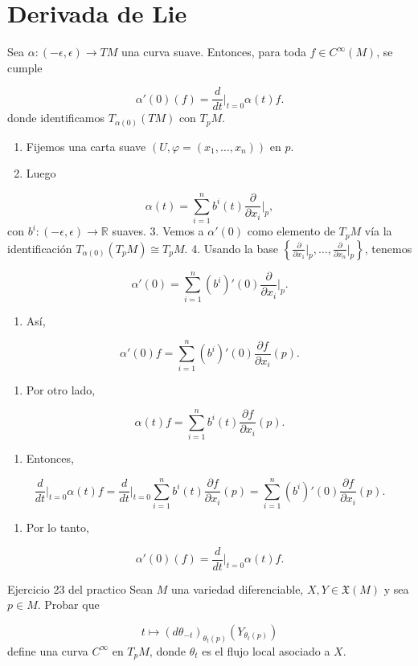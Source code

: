 \section{Derivada de Lie}
\begin{booklemma}{}
Sea $\alpha:(-\epsilon,\epsilon)\to TM$ una curva suave. Entonces, para toda $f\in C^\infty(M)$, se cumple

\[
\alpha'(0)(f)=\frac{d}{dt}\bigg|_{t=0}\alpha(t)f.
\]
donde identificamos $T_{\alpha(0)}(TM)$ con $T_pM$.

\end{booklemma}
\begin{bookproof}{}
\begin{enumerate}
\item Fijemos una carta suave $(U,\varphi=(x_1,\ldots,x_n))$ en $p$.
\item Luego
\end{enumerate}
\[
\alpha(t)=\sum_{i=1}^n b^i(t)\frac{\partial}{\partial x_i}\bigg|_p,
\]
con $b^i:(-\epsilon,\epsilon)\to\mathbb R$ suaves. 3. Vemos a $\alpha'(0)$ como elemento de $T_pM$ vía la identificación $T_{\alpha(0)}(T_pM)\cong T_pM$. 4. Usando la base $\left\{\frac{\partial}{\partial x_1}\bigg|_p,\ldots,\frac{\partial}{\partial x_n}\bigg|_p\right\}$, tenemos

\[
\alpha'(0)=\sum_{i=1}^n (b^i)'(0)\frac{\partial}{\partial x_i}\bigg|_p.
\]
\begin{enumerate}[start=5]
\item Así,
\end{enumerate}
\[
\alpha'(0)f=\sum_{i=1}^n (b^i)'(0)\frac{\partial f}{\partial x_i}(p).
\]
\begin{enumerate}[start=6]
\item Por otro lado,
\end{enumerate}
\[
\alpha(t)f=\sum_{i=1}^n b^i(t)\frac{\partial f}{\partial x_i}(p).
\]
\begin{enumerate}[start=7]
\item Entonces,
\end{enumerate}
\[
\frac{d}{dt}\bigg|_{t=0}\alpha(t)f=\frac{d}{dt}\bigg|_{t=0}\sum_{i=1}^n b^i(t)\frac{\partial f}{\partial x_i}(p)=\sum_{i=1}^n (b^i)'(0)\frac{\partial f}{\partial x_i}(p).
\]
\begin{enumerate}[start=8]
\item Por lo tanto,
\end{enumerate}
\[
\alpha'(0)(f)=\frac{d}{dt}\bigg|_{t=0}\alpha(t)f.
\]
\bookqed
\end{bookproof}
\begin{bookexercise}{Ejercicio 23 del practico}
Sean $M$ una variedad diferenciable, $X,Y\in\mathfrak X(M)$ y sea $p\in M$. Probar que

\[
t\mapsto(d\theta_{-t})_{\theta_t(p)}(Y_{\theta_t(p)})
\]
define una curva $C^\infty$ en $T_pM$, donde $\theta_t$ es el flujo local asociado a $X$.

\end{bookexercise}
